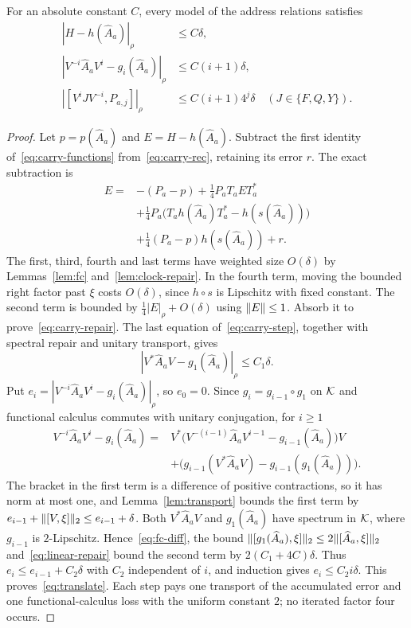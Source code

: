 \begin{lemma}\label{lem:carry}
For an absolute constant $C$, every model of the address relations satisfies
\begin{align}
 |H-h(\widehat A_a)|_\rho&\le C\delta,\label{eq:carry-repair}\\
 |V^{-i}\widehat A_aV^i-g_i(\widehat A_a)|_\rho&\le C(i+1)\delta,\label{eq:translate}\\
 |[V^iJV^{-i},P_{a,j}]|_\rho&\le C(i+1)4^j\delta
 \quad(J\in\{F,Q,Y\}).\label{eq:joint-address}
\end{align}
\end{lemma}
\begin{proof}
Let $p=p(\widehat A_a)$ and $E=H-h(\widehat A_a)$. Subtract the first identity of~\eqref{eq:carry-functions} from~\eqref{eq:carry-rec}, retaining its error $r$. The exact subtraction is
\begin{align*}
 E={}&-(P_a-p)+\tfrac14P_aT_aET_a^*\\
 &+\tfrac14P_a\bigl(T_ah(\widehat A_a)T_a^*-h(s(\widehat A_a))\bigr)\\
 &+\tfrac14(P_a-p)h(s(\widehat A_a))+r.
\end{align*}
The first, third, fourth and last terms have weighted size $O(\delta)$ by Lemmas~\ref{lem:fc} and~\ref{lem:clock-repair}. In the fourth term, moving the bounded right factor past $\xi$ costs $O(\delta)$, since $h\circ s$ is Lipschitz with fixed constant. The second term is bounded by $\tfrac14|E|_\rho+O(\delta)$ using $\lVert E\rVert\le1$. Absorb it to prove~\eqref{eq:carry-repair}. The last equation of~\eqref{eq:carry-step}, together with spectral repair and unitary transport, gives
\[
 |V^*\widehat A_aV-g_1(\widehat A_a)|_\rho\le C_1\delta.
\]
Put $e_i=|V^{-i}\widehat A_aV^i-g_i(\widehat A_a)|_\rho$, so $e_0=0$. Since $g_i=g_{i-1}\circ g_1$ on $\mathcal K$ and functional calculus commutes with unitary conjugation, for $i\ge1$
\begin{align*}
 V^{-i}\widehat A_aV^i-g_i(\widehat A_a)
 ={}&V^*\bigl(V^{-(i-1)}\widehat A_aV^{i-1}-g_{i-1}(\widehat A_a)\bigr)V\\
 &+\bigl(g_{i-1}(V^*\widehat A_aV)-g_{i-1}(g_1(\widehat A_a))\bigr).
\end{align*}
The bracket in the first term is a difference of positive contractions, so it has norm at most one, and Lemma~\ref{lem:transport} bounds the first term by $e_{i-1}+\lVert[V,\xi]\rVert_2\le e_{i-1}+\delta$. Both $V^*\widehat A_aV$ and $g_1(\widehat A_a)$ have spectrum in $\mathcal K$, where $g_{i-1}$ is $2$-Lipschitz. Hence~\eqref{eq:fc-diff}, the bound $\lVert[g_1(\widehat A_a),\xi]\rVert_2\le2\lVert[\widehat A_a,\xi]\rVert_2$ and~\eqref{eq:linear-repair} bound the second term by $2(C_1+4C)\delta$. Thus $e_i\le e_{i-1}+C_2\delta$ with $C_2$ independent of $i$, and induction gives $e_i\le C_2i\delta$. This proves~\eqref{eq:translate}. Each step pays one transport of the accumulated error and one functional-calculus loss with the uniform constant $2$; no iterated factor four occurs.


\end{proof}
